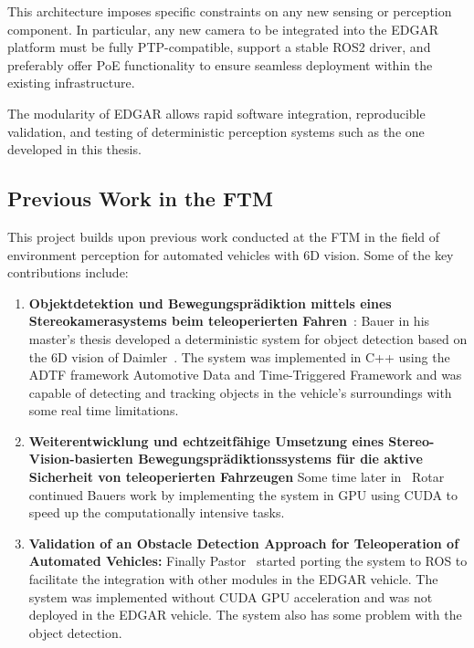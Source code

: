 This architecture imposes specific constraints on any new sensing or 
perception component. In particular, any new camera to be integrated into 
the EDGAR platform must be fully PTP-compatible, support a stable ROS2 
driver, and preferably offer PoE functionality to ensure seamless deployment 
within the existing infrastructure.

The modularity of EDGAR allows rapid software integration, reproducible 
validation, and testing of deterministic perception systems such as the one 
developed in this thesis.


\subsection{Previous Work in the FTM}

This project builds upon previous work conducted at the FTM in the field of environment perception 
for automated vehicles with 6D vision. Some of the key contributions include: 

\begin{enumerate}
  \item \textbf{Objektdetektion und Bewegungsprädiktion mittels eines Stereokamerasystems beim teleoperierten Fahren}~\cite{previous_tfm_bauer}: Bauer 
  in his master's thesis developed a deterministic system for object detection based on the 6D vision of Daimler~\cite{6d_vision_daimler}. The system 
  was implemented in C++ using the ADTF framework {Automotive Data and Time-Triggered Framework} and was capable of detecting and tracking objects in the vehicle's surroundings 
  with some real time limitations.

  \item \textbf{Weiterentwicklung und echtzeitfähige Umsetzung eines Stereo-Vision-basierten Bewegungsprädiktionssystems für die aktive Sicherheit von teleoperierten Fahrzeugen}
  Some time later in~\cite{previous_tfm_gpu_implementation} Rotar continued Bauers work by implementing the system in GPU using CUDA to speed up the computationally intensive tasks.

  \item \textbf{Validation of an Obstacle Detection Approach for Teleoperation of Automated Vehicles:} Finally Pastor~\cite{previous_tfm_pastor} started porting the system to ROS
   to facilitate the integration with other modules in the EDGAR vehicle. The system was implemented without CUDA GPU acceleration
   and was not deployed in the EDGAR vehicle. The system also has some problem with the object detection.
\end{enumerate}

